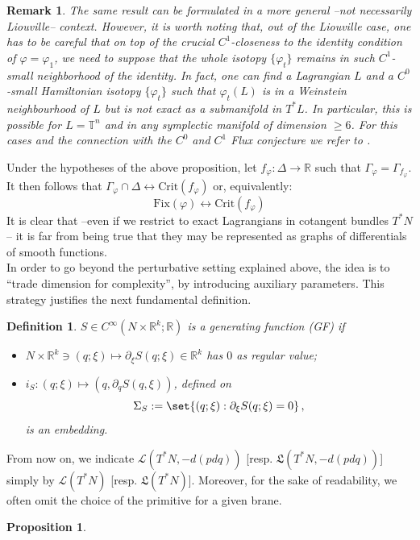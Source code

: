 \documentclass{article}
\newcommand{\1}{\mathbbm{1}}
\newcommand{\numberset}{\mathbb}
\newcommand{\R}{\numberset{R}}
\newtheorem{prp}[thm]{Proposition}
\newtheorem{defn}[thm]{Definition}
\newtheorem{rem}[thm]{Remark}
\theoremstyle{remark}
\begin{document}
{{\begin{rem}
\textnormal{The same result can be formulated in a more general --not necessarily Liouville-- context. However, it is worth noting that, out of the Liouville case, one has to be careful that on top of the crucial $C^1$-closeness to the identity condition of $\varphi=\varphi_1$, we need to suppose that the whole isotopy $\{\varphi_t\}$ remains in such $C^1$-small neighborhood of the identity. In fact, one can find a Lagrangian $L$ and a $C^0$-small Hamiltonian isotopy $\{\varphi_t\}$ such that $\varphi_t(L)$ is in a Weinstein neighbourhood of $L$ but is not exact as a submanifold in $T^*L$. In particular, this is possible for $L=\mathbb{T}^n$ and in any symplectic manifold of dimension $\geq 6$. For this cases and the connection with the $C^0$ and $C^1$ Flux conjecture we refer to \cite{ACLS}.}
\end{rem}
\noindent Under the hypotheses of the above proposition, let $f_{\varphi}:\Delta\rightarrow \R$ such that 
$\Gamma_\varphi = \Gamma_{f_\varphi}$. It then follows that $\Gamma_\varphi \cap \Delta \leftrightarrow \text{Crit}(f_{\varphi})$ or, equivalently:
$$\text{Fix}(\varphi) \leftrightarrow \text{Crit}(f_{\varphi}) $$
\noindent It is clear that --even if we restrict to exact Lagrangians in cotangent bundles $T^*N$-- it is far from being true that they may be represented as graphs of differentials of smooth functions. \\
\indent In order to go beyond the perturbative setting explained above, the idea is to ``trade dimension for complexity'', by introducing auxiliary parameters. This strategy justifies the next fundamental definition.
\begin{defn}
$S \in C^\infty(N\times \R^k;\R)$ is a generating function (GF) if
\begin{itemize}
\item[$(i)$] $N\times \R ^k \ni (q;\xi) \mapsto \partial_\xi S(q;\xi)\in \R^k$ has $0$ as regular value;
\item[$(ii)$] $i_S: (q;\xi) \mapsto (q,\partial_q S(q,\xi))$, defined on 
$$\Sigma_S := \set{ (q;\xi): \partial_\xi S(q;\xi) = 0}\, ,$$ 
is an embedding.
\end{itemize}
\end{defn}
\noindent From now on, we indicate $\mathscr{L}(T^*N,-d(pdq))$ [resp. $\mathfrak{L}(T^*N,-d(pdq))$] simply by $\mathscr{L}(T^*N)$ [resp. $\mathfrak{L}(T^*N)$]. Moreover, for the sake of readability, we often omit the choice of the primitive for
a given brane.
\begin{prp}\label{prp:GFQILagEmb}

\end{prp}}}
\end{document}
